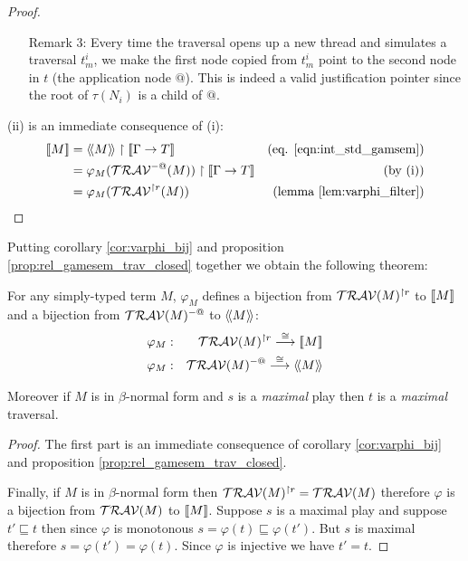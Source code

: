 \begin{proof}
\begin{itemize}
\begin{itemize}
    \item[Remark 3:]Every time the traversal opens up a new thread and simulates a
    traversal $t^i_{m}$, we make the first node copied from $t^i_{m}$ point to the
    second node in $t$ (the application node $@$). This is indeed a valid justification pointer since the root of $\tau(N_i)$ is a child of $@$.
    \end{itemize}
\end{itemize}

(ii) is an immediate consequence of (i):
\begin{align*}
\sem{M} &= \intersem{M} \upharpoonright \sem{\Gamma \rightarrow T} & \mbox{(eq. \ref{eqn:int_std_gamsem})} \\
        &= \varphi_M(\travset^{-@}(M)) \upharpoonright \sem{\Gamma \rightarrow T} & \mbox{(by (i))}\\
        &= \varphi_M(\travset^{\upharpoonright r}(M)) & \mbox{(lemma \ref{lem:varphi_filter})}\\
\end{align*}
\end{proof}

%




Putting corollary \ref{cor:varphi_bij} and proposition
\ref{prop:rel_gamesem_trav_closed} together we obtain the following
theorem:

\begin{thm}
For any simply-typed term $M$, $\varphi_M$ defines a bijection from
$\mathcal{TRAV}(M)^{\upharpoonright r}$ to ${[\![ M ]\!]}$ and a bijection
from $\mathcal{TRAV}(M)^{-@}$ to ${\langle\!\langle M \rangle\!\rangle}$:
\begin{eqnarray*}
 \varphi_M  &:& \mathcal{TRAV}(M)^{\upharpoonright r} \stackrel{\cong}{\longrightarrow} {[\![ M ]\!]} \\
 \varphi_M  &:& \mathcal{TRAV}(M)^{-@} \stackrel{\cong}{\longrightarrow} {\langle\!\langle M \rangle\!\rangle}
\end{eqnarray*}

Moreover if $M$ is in $\beta$-normal form and $s$ is a
\emph{maximal} play then  $t$ is a \emph{maximal} traversal.
\end{thm}

\begin{proof}
The first part is an immediate consequence of corollary
\ref{cor:varphi_bij} and proposition
\ref{prop:rel_gamesem_trav_closed}.

Finally, if $M$ is in $\beta$-normal form then
$\mathcal{TRAV}(M)^{\upharpoonright r} = \mathcal{TRAV}(M)$
therefore $\varphi$ is a bijection from $\mathcal{TRAV}(M)$ to
${[\![ M ]\!]}$. Suppose $s$ is a maximal play and suppose $t' \sqsubseteq
t$ then since $\varphi$ is monotonous $s = \varphi(t) \sqsubseteq
\varphi(t')$. But $s$ is maximal therefore $s = \varphi(t') =
\varphi(t)$. Since $\varphi$ is injective we have $t'=t$.
\end{proof}

